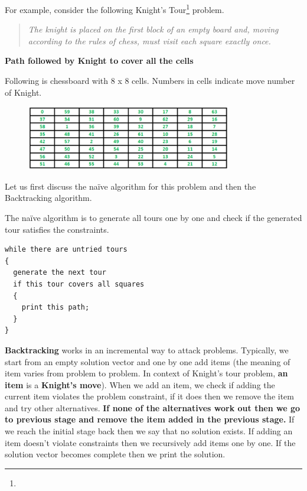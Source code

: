 For example, consider the following Knight's
Tour\footnote{}
problem.
\begin{quotation}\color{darkgray}
\itshape The knight is placed on the first block of an empty board and,
moving according to the rules of chess, must visit each square exactly once.
\end{quotation}

\textbf{Path followed by Knight to cover all the cells}

Following is chessboard with 8 x 8 cells. Numbers in cells indicate move
number of Knight.

\begin{figure}
\centering
\includegraphics[width=0.8\textwidth]{Images/figGFGBkTSet1KnightsTour}
\end{figure}

Let us first discuss the na\"ive algorithm for this problem and then the
Backtracking algorithm.


The na\"ive algorithm is to generate all tours one by one and check if the
generated tour satisfies the constraints.
\begin{lstlisting}[style=pseudostyle,numbers=none]
while there are untried tours
{ 
  generate the next tour 
  if this tour covers all squares 
  { 
    print this path;
  }
}
\end{lstlisting}
\textbf{Backtracking} works in an incremental way to attack problems.
Typically, we start from an empty solution vector and one by one add items
(the meaning of item varies from problem to problem. In context of Knight's
tour problem, \textbf{an item} is a \textbf{Knight's move}). When we add an
item, we check if adding the current item violates the problem constraint,
if it does then we remove the item and try other alternatives. \textbf{If
  none of the alternatives work out then we go to previous stage and remove
  the item added in the previous stage.} If we reach the initial stage back
then we say that no solution exists. If adding an item doesn't violate
constraints then we recursively add items one by one. If the solution vector
becomes complete then we print the solution.

